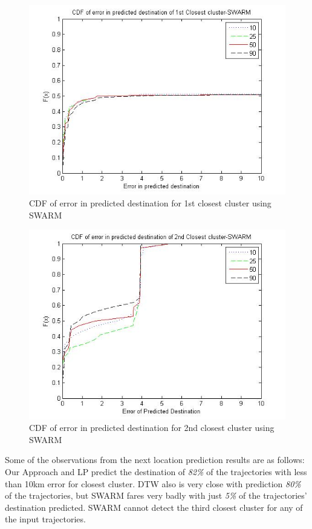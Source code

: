 \begin{figure}
\centering   
\includegraphics[scale=0.4]{figs/swarm_top.jpg}
\caption{CDF of error in predicted destination for 1st closest cluster using SWARM}
\label{fig:swarm_top}  
\end{figure}

\begin{figure}
\centering   
\includegraphics[scale=0.4]{figs/swarm_top2.jpg}
\caption{CDF of error in predicted destination for 2nd closest cluster using SWARM}
\label{fig:swarm_top2}  
\end{figure}

Some of the observations from the next location prediction results are as follows:\\
Our Approach and LP predict the destination of \emph{82\%} of the trajectories with less than 10km error for closest cluster. 
DTW also is very close with prediction \emph{80\%} of the trajectories, but SWARM fares very badly with just \emph{5\%} of the trajectories' destination predicted. SWARM cannot detect the third closest cluster for any of the input trajectories. 




